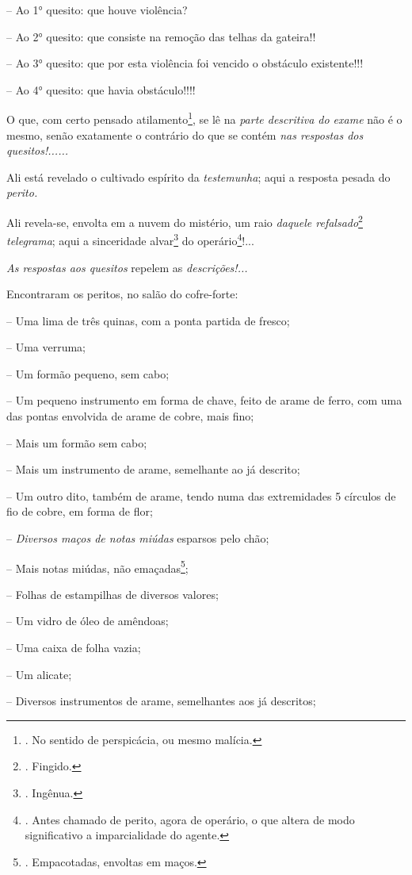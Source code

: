 -- Ao 1° quesito: que houve violência?

-- Ao 2° quesito: que consiste na remoção das telhas da gateira!!

-- Ao 3° quesito: que por esta violência foi vencido o obstáculo
existente!!!

-- Ao 4° quesito: que havia obstáculo!!!!

O que, com certo pensado atilamento\footnote{. No sentido de
  perspicácia, ou mesmo malícia.}, se lê na \emph{parte descritiva do
exame} não é o mesmo, senão exatamente o contrário do que se contém
\emph{nas respostas dos quesitos!......}

Ali está revelado o cultivado espírito da \emph{testemunha}; aqui a
resposta pesada do \emph{perito.}

Ali revela-se, envolta em a nuvem do mistério, um raio \emph{daquele
refalsado}\footnote{. Fingido.} \emph{telegrama}; aqui a sinceridade
alvar\footnote{. Ingênua.} do operário\footnote{. Antes chamado de
  perito, agora de operário, o que altera de modo significativo a
  imparcialidade do agente.}!...

\emph{As respostas aos quesitos} repelem as \emph{descrições!...}

Encontraram os peritos, no salão do cofre-forte:

-- Uma lima de três quinas, com a ponta partida de fresco;

-- Uma verruma;

-- Um formão pequeno, sem cabo;

-- Um pequeno instrumento em forma de chave, feito de arame de ferro,
com uma das pontas envolvida de arame de cobre, mais fino;

-- Mais um formão sem cabo;

-- Mais um instrumento de arame, semelhante ao já descrito;

-- Um outro dito, também de arame, tendo numa das extremidades 5
círculos de fio de cobre, em forma de flor;

-- \emph{Diversos maços de notas miúdas} esparsos pelo chão;

-- Mais notas miúdas, não emaçadas\footnote{. Empacotadas, envoltas em
  maços.};

-- Folhas de estampilhas de diversos valores;

-- Um vidro de óleo de amêndoas;

-- Uma caixa de folha vazia;

-- Um alicate;

-- Diversos instrumentos de arame, semelhantes aos já descritos;

